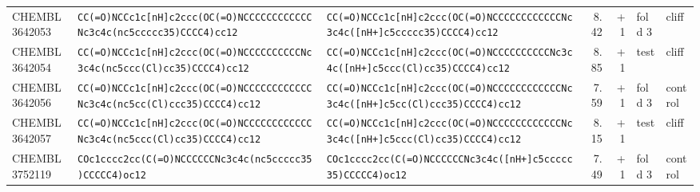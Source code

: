 \begin{longtable}{l p{4.4cm} p{4.4cm} r r l l}
CHEMBL3642053 & \texttt{CC(\allowbreak{}=\allowbreak{}O)\allowbreak{}NCCc1c[nH]\allowbreak{}c2ccc(\allowbreak{}OC(\allowbreak{}=\allowbreak{}O)\allowbreak{}NCCCCCCCCCCCCNc3c4c(\allowbreak{}nc5ccccc35)\allowbreak{}CCCC4)\allowbreak{}cc12} & \texttt{CC(\allowbreak{}=\allowbreak{}O)\allowbreak{}NCCc1c[nH]\allowbreak{}c2ccc(\allowbreak{}OC(\allowbreak{}=\allowbreak{}O)\allowbreak{}NCCCCCCCCCCCCNc3c4c(\allowbreak{}[nH+]\allowbreak{}c5ccccc35)\allowbreak{}CCCC4)\allowbreak{}cc12} & 8.42 & +1 & fold 3 & cliff \\
CHEMBL3642054 & \texttt{CC(\allowbreak{}=\allowbreak{}O)\allowbreak{}NCCc1c[nH]\allowbreak{}c2ccc(\allowbreak{}OC(\allowbreak{}=\allowbreak{}O)\allowbreak{}NCCCCCCCCCCNc3c4c(\allowbreak{}nc5ccc(\allowbreak{}Cl)\allowbreak{}cc35)\allowbreak{}CCCC4)\allowbreak{}cc12} & \texttt{CC(\allowbreak{}=\allowbreak{}O)\allowbreak{}NCCc1c[nH]\allowbreak{}c2ccc(\allowbreak{}OC(\allowbreak{}=\allowbreak{}O)\allowbreak{}NCCCCCCCCCCNc3c4c(\allowbreak{}[nH+]\allowbreak{}c5ccc(\allowbreak{}Cl)\allowbreak{}cc35)\allowbreak{}CCCC4)\allowbreak{}cc12} & 8.85 & +1 & test & cliff \\
CHEMBL3642056 & \texttt{CC(\allowbreak{}=\allowbreak{}O)\allowbreak{}NCCc1c[nH]\allowbreak{}c2ccc(\allowbreak{}OC(\allowbreak{}=\allowbreak{}O)\allowbreak{}NCCCCCCCCCCCCNc3c4c(\allowbreak{}nc5cc(\allowbreak{}Cl)\allowbreak{}ccc35)\allowbreak{}CCCC4)\allowbreak{}cc12} & \texttt{CC(\allowbreak{}=\allowbreak{}O)\allowbreak{}NCCc1c[nH]\allowbreak{}c2ccc(\allowbreak{}OC(\allowbreak{}=\allowbreak{}O)\allowbreak{}NCCCCCCCCCCCCNc3c4c(\allowbreak{}[nH+]\allowbreak{}c5cc(\allowbreak{}Cl)\allowbreak{}ccc35)\allowbreak{}CCCC4)\allowbreak{}cc12} & 7.59 & +1 & fold 3 & control \\
CHEMBL3642057 & \texttt{CC(\allowbreak{}=\allowbreak{}O)\allowbreak{}NCCc1c[nH]\allowbreak{}c2ccc(\allowbreak{}OC(\allowbreak{}=\allowbreak{}O)\allowbreak{}NCCCCCCCCCCCCNc3c4c(\allowbreak{}nc5ccc(\allowbreak{}Cl)\allowbreak{}cc35)\allowbreak{}CCCC4)\allowbreak{}cc12} & \texttt{CC(\allowbreak{}=\allowbreak{}O)\allowbreak{}NCCc1c[nH]\allowbreak{}c2ccc(\allowbreak{}OC(\allowbreak{}=\allowbreak{}O)\allowbreak{}NCCCCCCCCCCCCNc3c4c(\allowbreak{}[nH+]\allowbreak{}c5ccc(\allowbreak{}Cl)\allowbreak{}cc35)\allowbreak{}CCCC4)\allowbreak{}cc12} & 8.15 & +1 & test & cliff \\
CHEMBL3752119 & \texttt{COc1cccc2cc(\allowbreak{}C(\allowbreak{}=\allowbreak{}O)\allowbreak{}NCCCCCCNc3c4c(\allowbreak{}nc5ccccc35)\allowbreak{}CCCCC4)\allowbreak{}oc12} & \texttt{COc1cccc2cc(\allowbreak{}C(\allowbreak{}=\allowbreak{}O)\allowbreak{}NCCCCCCNc3c4c(\allowbreak{}[nH+]\allowbreak{}c5ccccc35)\allowbreak{}CCCCC4)\allowbreak{}oc12} & 7.49 & +1 & fold 3 & control \\

\end{longtable}
